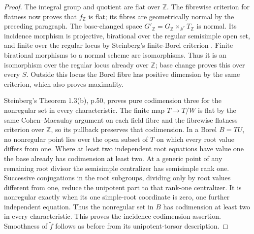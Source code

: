 \begin{proof}
The integral group and quotient are flat over $\mathbb Z$.
The fibrewise criterion for flatness now proves that
$f_{\mathbb Z}$ is flat; its fibres are geometrically normal by
the preceding paragraph.  The base-changed space
$G'_{\mathbb Z}=G_{\mathbb Z}\times_{\mathbb A^r}T_{\mathbb Z}$
is normal.  Its incidence morphism is projective, birational over
the regular semisimple open set, and finite over the regular
locus by Steinberg's finite-Borel criterion
\cite[Theorem 1.1, p.49]{D-Steinberg1965}.  Finite birational
morphisms to a normal scheme are isomorphisms.  Thus it is an
isomorphism over the regular locus already over $\mathbb Z$;
base change proves this over every $S$.  Outside this locus the
Borel fibre has positive dimension by the same criterion, which
also proves maximality.

Steinberg's Theorem 1.3(b), p.50, proves pure codimension three
for the nonregular set in every characteristic.  The finite map
$T\to T/W$ is flat by the same Cohen--Macaulay argument on each
field fibre and the fibrewise flatness criterion over
$\mathbb Z$, so its pullback preserves that codimension.  In
a Borel $B=TU$, no nonregular point lies over the open subset
of $T$ on which every root value differs from one.  Where at
least two independent root equations have value one the base
already has codimension at least two.  At a generic point of
any remaining root divisor the semisimple centralizer has
semisimple rank one.  Successive conjugations in the root
subgroups, dividing only by root values different from one,
reduce the unipotent part to that rank-one centralizer.  It is
nonregular exactly when its one simple-root coordinate is zero,
one further independent equation.  Thus the nonregular set
in $B$ has codimension at least two in every characteristic.
This proves the incidence codimension assertion.  Smoothness
of $\widetilde f$ follows as before from its unipotent-torsor
description.


\end{proof}
